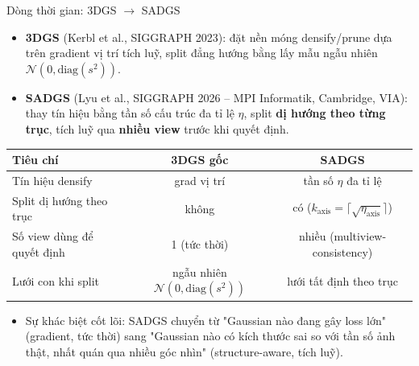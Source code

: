 \begin{frame}{Dòng thời gian: 3DGS $\to$ SADGS}
\footnotesize
\begin{itemize}
    \item \textbf{3DGS} (Kerbl et al., SIGGRAPH 2023): đặt nền móng densify/prune dựa trên gradient vị trí tích luỹ, split đẳng hướng bằng lấy mẫu ngẫu nhiên $\mathcal{N}(0, \mathrm{diag}(s^2))$.
    \item \textbf{SADGS} (Lyu et al., SIGGRAPH 2026 -- MPI Informatik, Cambridge, VIA): thay tín hiệu bằng tần số cấu trúc đa tỉ lệ $\eta$, split \textbf{dị hướng theo từng trục}, tích luỹ qua \textbf{nhiều view} trước khi quyết định.
\end{itemize}
\begin{table}
\centering
\begin{tabular}{lcc}
\toprule
\textbf{Tiêu chí} & \textbf{3DGS gốc} & \textbf{SADGS} \\
\midrule
Tín hiệu densify & grad vị trí & tần số $\eta$ đa tỉ lệ \\
Split dị hướng theo trục & không & có ($k_\text{axis}=\lceil\sqrt{\eta_\text{axis}}\rceil$) \\
Số view dùng để quyết định & 1 (tức thời) & nhiều (multiview-consistency) \\
Lưới con khi split & ngẫu nhiên $\mathcal{N}(0,\mathrm{diag}(s^2))$ & lưới tất định theo trục \\
\bottomrule
\end{tabular}
\end{table}
\begin{itemize}
    \item[$\Rightarrow$] Sự khác biệt cốt lõi: SADGS chuyển từ "Gaussian nào đang gây loss lớn" (gradient, tức thời) sang "Gaussian nào có kích thước sai so với tần số ảnh thật, nhất quán qua nhiều góc nhìn" (structure-aware, tích luỹ).
\end{itemize}
\end{frame}

